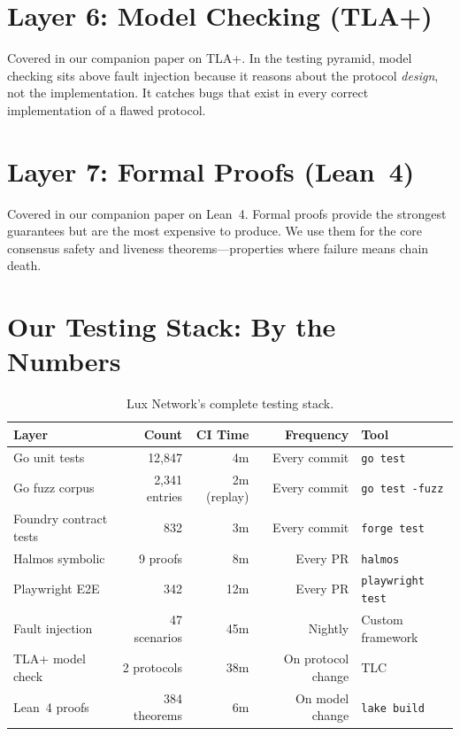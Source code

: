 \documentclass[11pt,a4paper]{article}
\begin{document}
\section{Layer 6: Model Checking (TLA+)}

Covered in our companion paper on TLA+. In the testing pyramid, model checking sits
above fault injection because it reasons about the protocol \emph{design}, not the
implementation. It catches bugs that exist in every correct implementation of a flawed
protocol.

\section{Layer 7: Formal Proofs (Lean~4)}

Covered in our companion paper on Lean~4. Formal proofs provide the strongest guarantees
but are the most expensive to produce. We use them for the core consensus safety and
liveness theorems---properties where failure means chain death.

\section{Our Testing Stack: By the Numbers}

\begin{table}[H]
\centering
\small
\begin{tabular}{@{}lrrrl@{}}
\toprule
\textbf{Layer} & \textbf{Count} & \textbf{CI Time} & \textbf{Frequency} & \textbf{Tool} \\
\midrule
Go unit tests & 12,847 & 4m & Every commit & \texttt{go test} \\
Go fuzz corpus & 2,341 entries & 2m (replay) & Every commit & \texttt{go test -fuzz} \\
Foundry contract tests & 832 & 3m & Every commit & \texttt{forge test} \\
Halmos symbolic & 9 proofs & 8m & Every PR & \texttt{halmos} \\
Playwright E2E & 342 & 12m & Every PR & \texttt{playwright test} \\
Fault injection & 47 scenarios & 45m & Nightly & Custom framework \\
TLA+ model check & 2 protocols & 38m & On protocol change & TLC \\
Lean~4 proofs & 384 theorems & 6m & On model change & \texttt{lake build} \\
\bottomrule
\end{tabular}
\caption{Lux Network's complete testing stack.}
\end{table}
\end{document}
